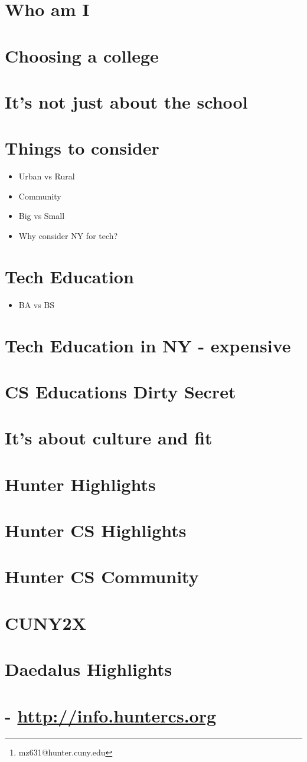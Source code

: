 \documentclass[11pt]{article}
\author{Mike Zamansky\thanks{mz631@hunter.cuny.edu}}
\date{}
\title{}
\begin{document}
\section*{Who am I}
\label{sec:orgaeeedb6}
\section*{Choosing a college}
\label{sec:org1e32bcf}
\section*{It's not just about the school}
\label{sec:org49fe9b8}
\section*{Things to consider}
\label{sec:org84de4f6}
\begin{itemize}
\item Urban vs Rural
\item Community
\item Big vs Small
\item Why consider NY for tech?
\end{itemize}
\section*{Tech Education}
\label{sec:org2ec1201}
\begin{itemize}
\item BA vs BS
\end{itemize}
\section*{Tech Education in NY - expensive}
\label{sec:org2a1707b}
\section*{CS Educations Dirty Secret}
\label{sec:org4f3d5c5}
\section*{It's about culture and fit}
\label{sec:org1dcfceb}
\section*{Hunter Highlights}
\label{sec:org8d75967}
\section*{Hunter CS Highlights}
\label{sec:org10f2dcd}
\section*{Hunter CS Community}
\label{sec:orgf85538d}
\section*{CUNY2X}
\label{sec:orgb1bedd5}
\section*{Daedalus Highlights}
\label{sec:orgcc66e82}
\section*{- \url{http://info.huntercs.org}}
\label{sec:org8502f14}
\end{document}
